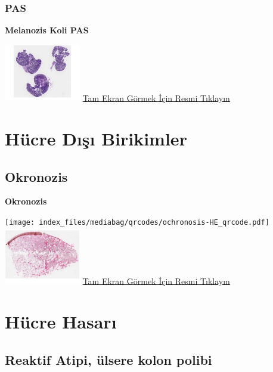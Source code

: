 \documentclass[
  letterpaper,
  DIV=11,
  numbers=noendperiod]{scrreprt}
\begin{document}
\hypertarget{pas-2}{%
\subsection{PAS}\label{pas-2}}

\textbf{Melanozis Koli PAS}

\href{https://images.patolojiatlasi.com/melanosiscoli/PAS.html}{\includegraphics[width=0.25\textwidth,height=\textheight]{./screenshots/thumbnail_melanosiscoli-PAS.png}}
\href{https://images.patolojiatlasi.com/melanosiscoli/PAS.html}{Tam
Ekran Görmek İçin Resmi Tıklayın}

\hypertarget{sec-hucre-disi-birikimler}{%
\chapter{Hücre Dışı Birikimler}\label{sec-hucre-disi-birikimler}}

\hypertarget{sec-okronozis}{%
\section{Okronozis}\label{sec-okronozis}}

\textbf{Okronozis}

\texttt{[image: index\_files/mediabag/qrcodes/ochronosis-HE\_qrcode.pdf]}
\href{https://images.patolojiatlasi.com/ochronosis/HE.html}{\includegraphics[width=0.25\textwidth,height=\textheight]{./screenshots/thumbnail_ochronosis.png}}
\href{https://images.patolojiatlasi.com/ochronosis/HE.html}{Tam Ekran
Görmek İçin Resmi Tıklayın}

\hypertarget{sec-hucre-hasari}{%
\chapter{Hücre Hasarı}\label{sec-hucre-hasari}}

\hypertarget{sec-reaktif-atipi}{%
\section{Reaktif Atipi, ülsere kolon polibi}\label{sec-reaktif-atipi}}
\end{document}
